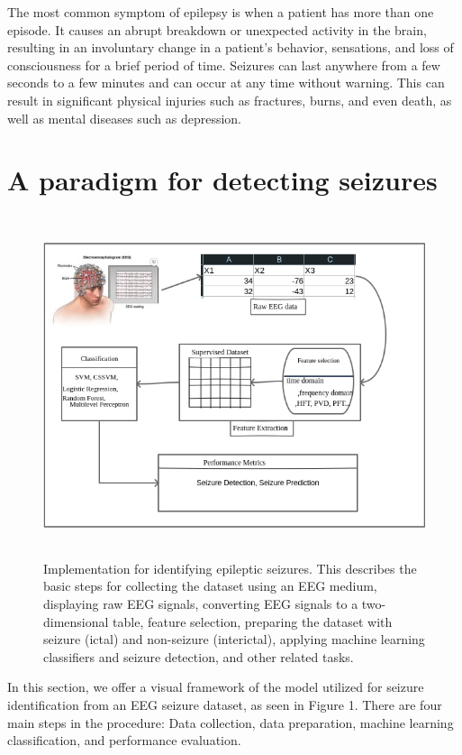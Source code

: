 \documentclass[10pt,twocolumn,letterpaper]{article}
\begin{document}
The most common symptom of epilepsy is when a patient has more than one episode. It causes an abrupt breakdown or unexpected activity in the brain, resulting in an involuntary change in a patient's behavior, sensations, and loss of consciousness for a brief period of time. Seizures can last anywhere from a few seconds to a few minutes and can occur at any time without warning. This can result in significant physical injuries such as fractures, burns, and even death, as well as mental diseases such as depression\cite{Unpredictability}.

\section{A paradigm for detecting seizures}
\begin{figure}[h]
  \centering
  \includegraphics[width=\textwidth,height=10cm]{fff.jpg}
  \caption{Implementation for identifying epileptic seizures. This describes the basic steps for collecting the dataset using an EEG medium, displaying raw EEG signals, converting EEG signals to a two-dimensional table, feature selection, preparing the dataset with seizure (ictal) and non-seizure (interictal), applying machine learning classifiers and seizure detection, and other related tasks. }
\end{figure}

In this section, we offer a visual framework of the model utilized for seizure identification from an EEG seizure dataset, as seen in Figure 1. There are four main steps in the procedure: Data collection, data preparation, machine learning classification, and performance evaluation. 
\end{document}
